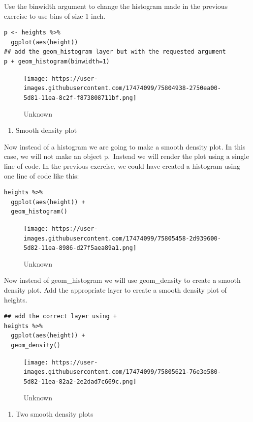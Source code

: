\documentclass[
]{article}
\providecommand{\tightlist}{%
  \setlength{\itemsep}{0pt}\setlength{\parskip}{0pt}}
\begin{document}
Use the binwidth argument to change the histogram made in the previous
exercise to use bins of size 1 inch.

\begin{verbatim}
p <- heights %>% 
  ggplot(aes(height))
## add the geom_histogram layer but with the requested argument
p + geom_histogram(binwidth=1)
\end{verbatim}

\begin{figure}
\centering
\texttt{[image: https://user-images.githubusercontent.com/17474099/75804938-2750ea00-5d81-11ea-8c2f-f873808711bf.png]}
\caption{Unknown}
\end{figure}

\begin{enumerate}
\def\labelenumi{\arabic{enumi}.}
\setcounter{enumi}{18}
\tightlist
\item
  Smooth density plot
\end{enumerate}

Now instead of a histogram we are going to make a smooth density plot.
In this case, we will not make an object p.~Instead we will render the
plot using a single line of code. In the previous exercise, we could
have created a histogram using one line of code like this:

\begin{verbatim}
heights %>% 
  ggplot(aes(height)) +
  geom_histogram()
\end{verbatim}

\begin{figure}
\centering
\texttt{[image: https://user-images.githubusercontent.com/17474099/75805458-2d939600-5d82-11ea-8986-d27f5aea89a1.png]}
\caption{Unknown}
\end{figure}

Now instead of geom\_histogram we will use geom\_density to create a
smooth density plot. Add the appropriate layer to create a smooth
density plot of heights.

\begin{verbatim}
## add the correct layer using +
heights %>% 
  ggplot(aes(height)) +
  geom_density()
\end{verbatim}

\begin{figure}
\centering
\texttt{[image: https://user-images.githubusercontent.com/17474099/75805621-76e3e580-5d82-11ea-82a2-2e2dad7c669c.png]}
\caption{Unknown}
\end{figure}

\begin{enumerate}
\def\labelenumi{\arabic{enumi}.}
\setcounter{enumi}{19}
\tightlist
\item
  Two smooth density plots
\end{enumerate}
\end{document}
